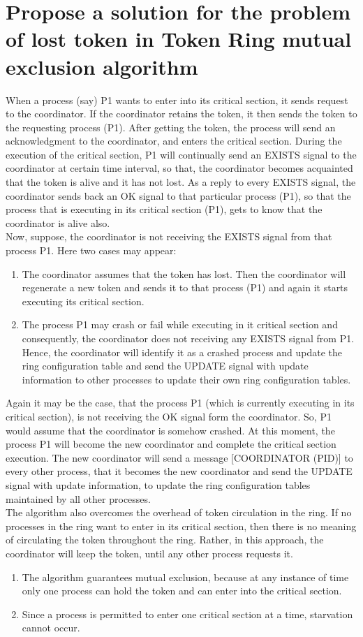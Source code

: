 \documentclass[11pt,a4paper]{report}
\begin{document}
\section{Propose a solution for the problem of lost token in Token Ring mutual exclusion algorithm}
When a process (say) P1 wants to enter into its critical
section, it sends request to the coordinator. If the
coordinator retains the token, it then sends the token to the
requesting process (P1). After getting the token, the
process will send an acknowledgment to the coordinator,
and enters the critical section. During the execution of the
critical section, P1 will continually send an EXISTS signal
to the coordinator at certain time interval, so that, the
coordinator becomes acquainted that the token is alive and
it has not lost. As a reply to every EXISTS signal, the
coordinator sends back an OK signal to that particular
process (P1), so that the process that is executing in its
critical section (P1), gets to know that the coordinator is
alive also.\\
Now, suppose, the coordinator is not receiving the
EXISTS signal from that process P1. Here two cases may
appear:
\begin{enumerate}
	\item The coordinator assumes that the token has lost. Then the coordinator will regenerate a new token and sends it to that
process (P1) and again it starts executing its critical
section.
	\item The process P1 may crash or fail while executing in it
critical section and consequently, the coordinator does not
receiving any EXISTS signal from P1. Hence, the coordinator will identify it as a crashed process and update the ring configuration table and send the UPDATE signal with update information to other processes to update their own ring configuration tables.
\end{enumerate}
Again it may be the case, that the process P1 (which is currently executing in its critical section), is not receiving the OK signal form the coordinator. So, P1 would assume that the coordinator is somehow crashed. At this moment, the process P1 will become the new coordinator and complete the critical section execution. The new coordinator will send a message [COORDINATOR (PID)] to every other process, that it becomes the new coordinator and send the UPDATE signal with update information, to update the ring configuration tables maintained by all other
processes.\\
The algorithm also overcomes the overhead of token
circulation in the ring. If no processes in the ring want to
enter in its critical section, then there is no meaning of
circulating the token throughout the ring. Rather, in this
approach, the coordinator will keep the token, until any
other process requests it.
\begin{enumerate}
	\item The algorithm guarantees mutual exclusion, because at
any instance of time only one process can hold the token and can enter into the critical section.
	\item Since a process is permitted to enter one critical
section at a time, starvation cannot occur. 
\end{enumerate}
\end{document}
